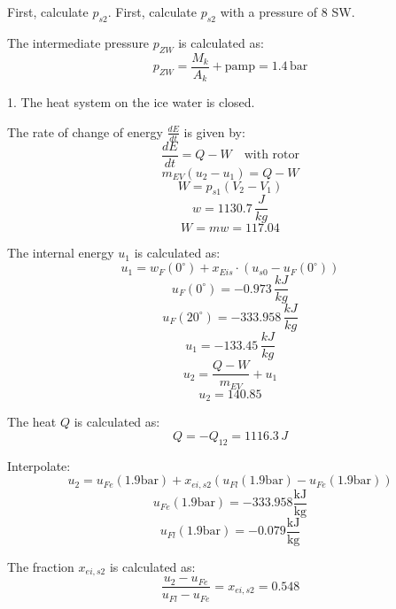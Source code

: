 First, calculate \( p_{s2} \).
First, calculate \( p_{s2} \) with a pressure of 8 SW.

The intermediate pressure \( p_{ZW} \) is calculated as:
\[ p_{ZW} = \frac{M_{k}}{A_{k}} + \text{pamp} = 1.4 \, \text{bar} \]

1. The heat system on the ice water is closed.

The rate of change of energy \( \frac{dE}{dt} \) is given by:
\[ \frac{dE}{dt} = Q - W \quad \text{with rotor} \]
\[ m_{EV}(u_2 - u_1) = Q - W \]
\[ W = p_{s1}(V_2 - V_1) \]
\[ w = 1130.7 \, \frac{J}{kg} \]
\[ W = m w = 117.04 \]

The internal energy \( u_1 \) is calculated as:
\[ u_1 = w_{F}(0^\circ) + x_{Eis} \cdot (u_{s0} - u_{F}(0^\circ)) \]
\[ u_{F}(0^\circ) = -0.973 \, \frac{kJ}{kg} \]
\[ u_{F}(20^\circ) = -333.958 \, \frac{kJ}{kg} \]
\[ u_1 = -133.45 \, \frac{kJ}{kg} \]
\[ u_2 = \frac{Q - W}{m_{EV}} + u_1 \]
\[ u_2 = 140.85 \]

The heat \( Q \) is calculated as:
\[ Q = -Q_{12} = 1116.3 \, J \]

Interpolate:
\[ u_2 = u_{Fe}(1.9 \text{bar}) + x_{ei,s2} (u_{Fl}(1.9 \text{bar}) - u_{Fe}(1.9 \text{bar})) \]
\[ u_{Fe}(1.9 \text{bar}) = -333.958 \frac{\text{kJ}}{\text{kg}} \]
\[ u_{Fl}(1.9 \text{bar}) = -0.079 \frac{\text{kJ}}{\text{kg}} \]

The fraction \( x_{ei,s2} \) is calculated as:
\[ \frac{u_2 - u_{Fe}}{u_{Fl} - u_{Fe}} = x_{ei,s2} = 0.548 \]